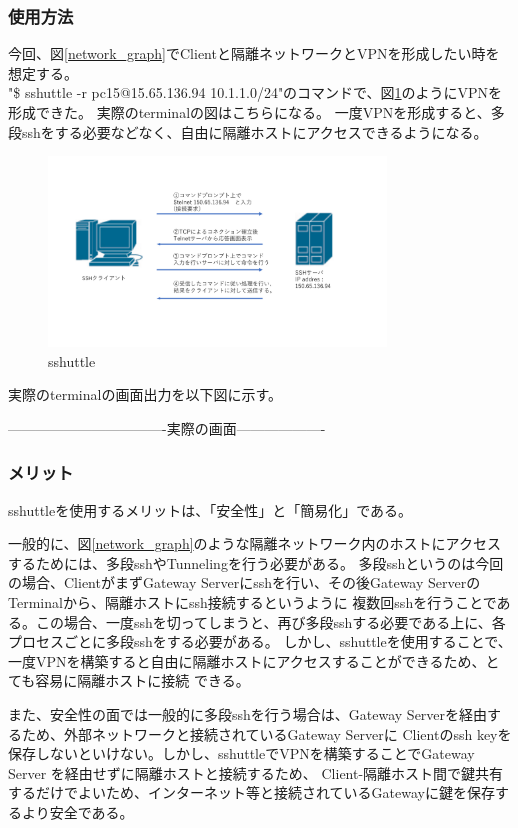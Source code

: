 \documentclass[12pt,a4paper,titlepage]{jsarticle}
\begin{document}
\subsubsection*{使用方法}
今回、図\ref{network_graph}でClientと隔離ネットワークとVPNを形成したい時を想定する。\\
"\$ sshuttle -r pc15@15.65.136.94 10.1.1.0/24"のコマンドで、図\ref{sshuttle}のようにVPNを形成できた。
実際のterminalの図はこちらになる。
一度VPNを形成すると、多段sshをする必要などなく、自由に隔離ホストにアクセスできるようになる。



\begin{figure}[h]
    \centering
    \includegraphics[width=0.8\textwidth, page=7]{graphs/network_archtecture.pdf}
    \caption{sshuttle}
    \label{sshuttle}
\end{figure}
実際のterminalの画面出力を以下図に示す。

----------------------------------実際の画面-------------------



\subsubsection*{メリット}
sshuttleを使用するメリットは、「安全性」と「簡易化」である。\par
一般的に、図\ref{network_graph}のような隔離ネットワーク内のホストにアクセスするためには、多段sshやTunnelingを行う必要がある。
多段sshというのは今回の場合、ClientがまずGateway Serverにsshを行い、その後Gateway ServerのTerminalから、隔離ホストにssh接続するというように
複数回sshを行うことである。この場合、一度sshを切ってしまうと、再び多段sshする必要である上に、各プロセスごとに多段sshをする必要がある。
しかし、sshuttleを使用することで、一度VPNを構築すると自由に隔離ホストにアクセスすることができるため、とても容易に隔離ホストに接続
できる。\par
また、安全性の面では一般的に多段sshを行う場合は、Gateway Serverを経由するため、外部ネットワークと接続されているGateway Serverに
Clientのssh keyを保存しないといけない。しかし、sshuttleでVPNを構築することでGateway Server を経由せずに隔離ホストと接続するため、
Client-隔離ホスト間で鍵共有するだけでよいため、インターネット等と接続されているGatewayに鍵を保存するより安全である。
\end{document}
